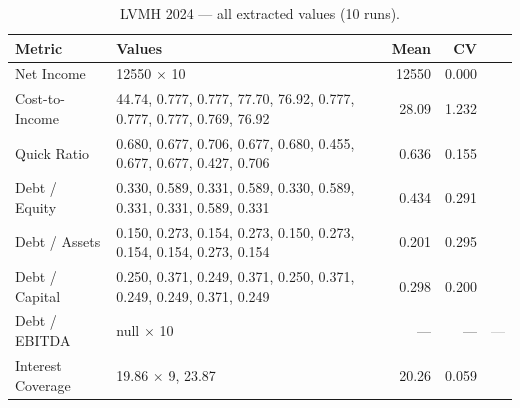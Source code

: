 \documentclass[12pt, a4paper]{article}
\newcommand{\cmark}{\textcolor{green!60!black}{\ding{51}}}  %
\newcommand{\xmark}{\textcolor{red!70!black}{\ding{55}}}    %
\newcommand{\nmark}{\textcolor{gray}{---}}                   %
\begin{document}
\begin{table}[H]
\centering\small
\caption{LVMH 2024 --- all extracted values (10 runs).}
\label{tab:lvm-raw}
\begin{tabular}{lp{8.5cm}rrc}
\toprule
\textbf{Metric} & \textbf{Values} & \textbf{Mean} & \textbf{CV} & \\
\midrule
Net Income        & 12550 $\times$ 10                                                  & 12550 & 0.000 & \cmark \\
Cost-to-Income    & 44.74, 0.777, 0.777, 77.70, 76.92, 0.777, 0.777, 0.777, 0.769, 76.92 & 28.09 & 1.232 & \xmark \\
Quick Ratio       & 0.680, 0.677, 0.706, 0.677, 0.680, 0.455, 0.677, 0.677, 0.427, 0.706 & 0.636 & 0.155 & \xmark \\
Debt / Equity     & 0.330, 0.589, 0.331, 0.589, 0.330, 0.589, 0.331, 0.331, 0.589, 0.331 & 0.434 & 0.291 & \xmark \\
Debt / Assets     & 0.150, 0.273, 0.154, 0.273, 0.150, 0.273, 0.154, 0.154, 0.273, 0.154 & 0.201 & 0.295 & \xmark \\
Debt / Capital    & 0.250, 0.371, 0.249, 0.371, 0.250, 0.371, 0.249, 0.249, 0.371, 0.249 & 0.298 & 0.200 & \xmark \\
Debt / EBITDA     & null $\times$ 10                                                   &  ---  &  ---  & \nmark \\
Interest Coverage & 19.86 $\times$ 9, 23.87                                            & 20.26 & 0.059 & \xmark \\
\bottomrule
\end{tabular}
\end{table}
\end{document}
